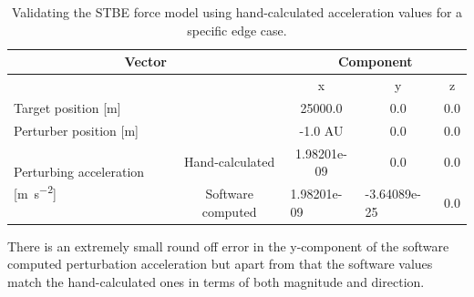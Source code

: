 \begin{table}[htb]
\centering
\captionsetup{justification=centering}
\caption{Validating the \gls{STBE} force model using hand-calculated acceleration values for a specific edge case.}
\label{tab:stbe_vv_handcalculated_data}
\begin{tabular}{|l|c|c|c|c|}
\hline
\multicolumn{2}{|c|}{\textbf{Vector}} & \multicolumn{3}{c|}{\textbf{Component}} \\ \hline
\multicolumn{2}{|c|}{} & x & y & z \\ \hline
\multicolumn{2}{|l|}{Target position {[}m{]}} & 25000.0 & 0.0 & 0.0 \\ \hline
\multicolumn{2}{|l|}{Perturber position {[}m{]}} & -1.0 AU & 0.0 & 0.0 \\ \hline
\multirow{2}{*}{Perturbing acceleration {[}\si{\metre \per \second \squared}{]}} & Hand-calculated & 1.98201e-09 & 0.0 & 0.0 \\ \cline{2-5}
 & Software computed & \multicolumn{1}{l|}{1.98201e-09} & \multicolumn{1}{l|}{-3.64089e-25} & \multicolumn{1}{l|}{0.0} \\ \hline
\end{tabular}
\end{table}
\FloatBarrier
There is an extremely small round off error in the y-component of the software computed perturbation acceleration but apart from that the software values match the hand-calculated ones in terms of both magnitude and direction.

